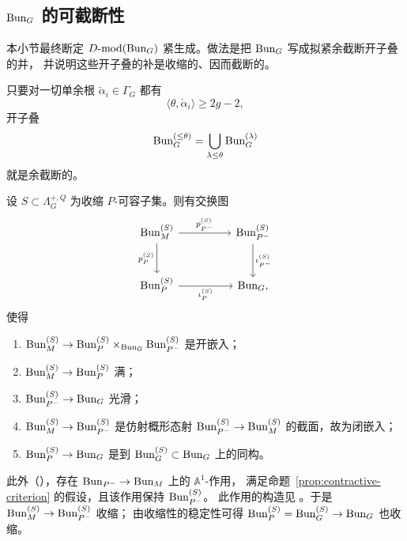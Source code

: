 \subsection{\texorpdfstring{$\mathrm{Bun}_G$ 的可截断性}{G 的可截断性}}
\label{sec:truncatable}

本小节最终断定 $D\text{-}\mathrm{mod}(\mathrm{Bun}_G)$ 紧生成。做法是把 $\mathrm{Bun}_G$ 写成拟紧余截断开子叠的并，
并说明这些开子叠的补是收缩的、因而截断的。

\begin{proposition}[{[DG15, 定理 9.1.2]}]
\label{prop:open-substack-cotrunc}
只要对一切单余根 $\check\alpha_i\in \Gamma_G$ 都有
\[
\langle\theta,\check\alpha_i\rangle\ge 2g-2,
\]
开子叠
\[
\mathrm{Bun}^{(\le\theta)}_G=\bigcup_{\lambda\le \theta}\mathrm{Bun}^{(\lambda)}_G
\]
就是余截断的。
\end{proposition}

\begin{proposition}[{[DG15, 引理 11.3.4]}]
\label{prop:square-M-P}
设 $S\subset \Lambda^{+,Q}_G$ 为收缩 $P$-可容子集。则有交换图
\[
\begin{tikzcd}[column sep=huge,row sep=large]
\Bun^{(S)}_M \arrow[r,"p^{(S)}_{P^-}"] \arrow[d,"p^{(S)}_P"'] &
\Bun^{(S)}_{P^-} \arrow[d,"\iota^{(S)}_{P^-}"]\\
\Bun^{(S)}_P \arrow[r,"\iota^{(S)}_P"'] & \Bun_G,
\end{tikzcd}
\]
使得
\begin{enumerate}
\item[(a)] $\mathrm{Bun}^{(S)}_M\to \mathrm{Bun}^{(S)}_P\times_{\mathrm{Bun}_G}\mathrm{Bun}^{(S)}_{P^-}$ 是开嵌入；
\item[(b)] $\mathrm{Bun}^{(S)}_M\to \mathrm{Bun}^{(S)}_P$ 满；
\item[(c)] $\mathrm{Bun}^{(S)}_{P^-}\to \mathrm{Bun}_G$ 光滑；
\item[(d)] $\mathrm{Bun}^{(S)}_M\to \mathrm{Bun}^{(S)}_{P^-}$ 是仿射概形态射
$\mathrm{Bun}^{(S)}_{P^-}\to \mathrm{Bun}^{(S)}_M$ 的截面，故为闭嵌入；
\item[(e)] $\mathrm{Bun}^{(S)}_P\to \mathrm{Bun}_G$ 是到 $\mathrm{Bun}^{(S)}_G\subset \mathrm{Bun}_G$ 上的同构。
\end{enumerate}
\end{proposition}

此外（\cite[命题 11.3.7]{DG15}），存在 $\mathrm{Bun}_{P^-}\to \mathrm{Bun}_M$ 上的 $\mathbb{A}^1$-作用，
满足命题~\ref{prop:contractive-criterion} 的假设，且该作用保持 $\mathrm{Bun}^{(S)}_{P^-}$。
此作用的构造见 \cite[11.2]{DG15}。于是 $\mathrm{Bun}^{(S)}_M\to \mathrm{Bun}^{(S)}_{P^-}$ 收缩；
由收缩性的稳定性可得 $\mathrm{Bun}^{(S)}_P=\mathrm{Bun}^{(S)}_G\to \mathrm{Bun}_G$ 也收缩。

